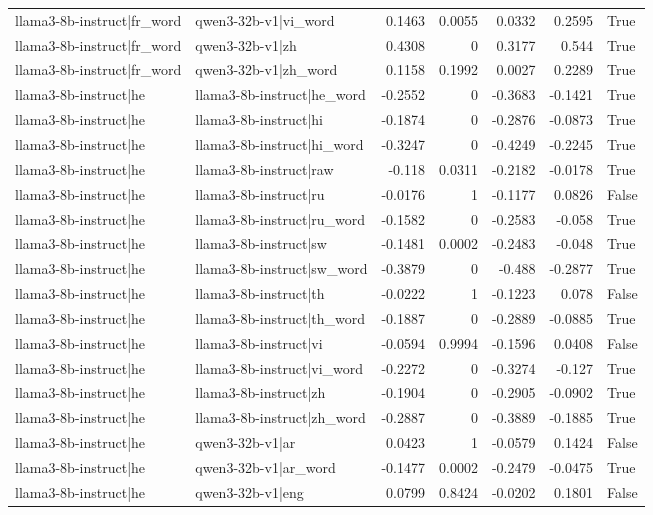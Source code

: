 \begin{table}
\begin{tabular}{l l r r r r l}
llama3-8b-instruct|fr_word & qwen3-32b-v1|vi_word & 0.1463 & 0.0055 & 0.0332 & 0.2595 & True \\
llama3-8b-instruct|fr_word & qwen3-32b-v1|zh & 0.4308 & 0 & 0.3177 & 0.544 & True \\
llama3-8b-instruct|fr_word & qwen3-32b-v1|zh_word & 0.1158 & 0.1992 & 0.0027 & 0.2289 & True \\
llama3-8b-instruct|he & llama3-8b-instruct|he_word & -0.2552 & 0 & -0.3683 & -0.1421 & True \\
llama3-8b-instruct|he & llama3-8b-instruct|hi & -0.1874 & 0 & -0.2876 & -0.0873 & True \\
llama3-8b-instruct|he & llama3-8b-instruct|hi_word & -0.3247 & 0 & -0.4249 & -0.2245 & True \\
llama3-8b-instruct|he & llama3-8b-instruct|raw & -0.118 & 0.0311 & -0.2182 & -0.0178 & True \\
llama3-8b-instruct|he & llama3-8b-instruct|ru & -0.0176 & 1 & -0.1177 & 0.0826 & False \\
llama3-8b-instruct|he & llama3-8b-instruct|ru_word & -0.1582 & 0 & -0.2583 & -0.058 & True \\
llama3-8b-instruct|he & llama3-8b-instruct|sw & -0.1481 & 0.0002 & -0.2483 & -0.048 & True \\
llama3-8b-instruct|he & llama3-8b-instruct|sw_word & -0.3879 & 0 & -0.488 & -0.2877 & True \\
llama3-8b-instruct|he & llama3-8b-instruct|th & -0.0222 & 1 & -0.1223 & 0.078 & False \\
llama3-8b-instruct|he & llama3-8b-instruct|th_word & -0.1887 & 0 & -0.2889 & -0.0885 & True \\
llama3-8b-instruct|he & llama3-8b-instruct|vi & -0.0594 & 0.9994 & -0.1596 & 0.0408 & False \\
llama3-8b-instruct|he & llama3-8b-instruct|vi_word & -0.2272 & 0 & -0.3274 & -0.127 & True \\
llama3-8b-instruct|he & llama3-8b-instruct|zh & -0.1904 & 0 & -0.2905 & -0.0902 & True \\
llama3-8b-instruct|he & llama3-8b-instruct|zh_word & -0.2887 & 0 & -0.3889 & -0.1885 & True \\
llama3-8b-instruct|he & qwen3-32b-v1|ar & 0.0423 & 1 & -0.0579 & 0.1424 & False \\
llama3-8b-instruct|he & qwen3-32b-v1|ar_word & -0.1477 & 0.0002 & -0.2479 & -0.0475 & True \\
llama3-8b-instruct|he & qwen3-32b-v1|eng & 0.0799 & 0.8424 & -0.0202 & 0.1801 & False \\

\end{tabular}
\end{table}

